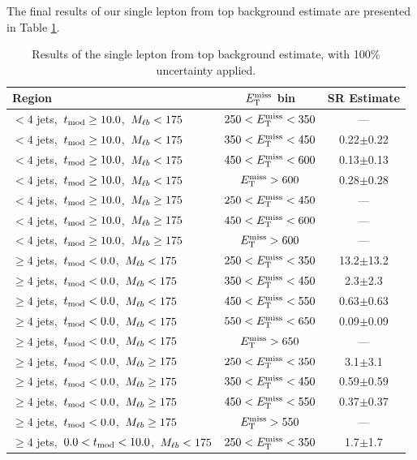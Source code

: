 The final results of our single lepton from top background estimate
are presented in Table \ref{tab:stop:1ltop:results}.

\begin{table}[htbp]
\centering
\caption{Results of the single lepton from top background estimate,
  with 100\% uncertainty applied.}
\label{tab:stop:1ltop:results}
\begin{tabular}{|l|c|c|}
\hline
Region & $E_\text{T}^\text{miss}$ bin & SR Estimate\\
\hline
$<4$ jets,~$t_\text{mod} \ge10.0$,~$M_{\ell b} <175$ & $250<E_\text{T}^\text{miss}<350$ &  ---  \\
$<4$ jets,~$t_\text{mod} \ge10.0$,~$M_{\ell b} <175$ & $350<E_\text{T}^\text{miss}<450$ &  0.22$\pm$0.22 \\
$<4$ jets,~$t_\text{mod} \ge10.0$,~$M_{\ell b} <175$ & $450<E_\text{T}^\text{miss}<600$ &  0.13$\pm$0.13  \\
$<4$ jets,~$t_\text{mod} \ge10.0$,~$M_{\ell b} <175$ & $E_\text{T}^\text{miss}>600$     &  0.28$\pm$0.28 \\
\hline
$<4$ jets,~$t_\text{mod} \ge10.0$,~$M_{\ell b} \ge175$ & $250<E_\text{T}^\text{miss}<450$ &  --- \\
$<4$ jets,~$t_\text{mod} \ge10.0$,~$M_{\ell b} \ge175$ & $450<E_\text{T}^\text{miss}<600$ &  ---  \\
$<4$ jets,~$t_\text{mod} \ge10.0$,~$M_{\ell b} \ge175$ & $E_\text{T}^\text{miss}>600$     &  ---  \\
\hline
$\ge4$ jets,~$t_\text{mod} <0.0$,~$M_{\ell b} <175$ & $250<E_\text{T}^\text{miss}<350$ &  13.2$\pm$13.2  \\
$\ge4$ jets,~$t_\text{mod} <0.0$,~$M_{\ell b} <175$ & $350<E_\text{T}^\text{miss}<450$ &  2.3$\pm$2.3  \\
$\ge4$ jets,~$t_\text{mod} <0.0$,~$M_{\ell b} <175$ & $450<E_\text{T}^\text{miss}<550$ &  0.63$\pm$0.63  \\
$\ge4$ jets,~$t_\text{mod} <0.0$,~$M_{\ell b} <175$ & $550<E_\text{T}^\text{miss}<650$ &  0.09$\pm$0.09 \\
$\ge4$ jets,~$t_\text{mod} <0.0$,~$M_{\ell b} <175$ & $E_\text{T}^\text{miss}>650$     &  --- \\
\hline
$\ge4$ jets,~$t_\text{mod} <0.0$,~$M_{\ell b} \ge175$ & $250<E_\text{T}^\text{miss}<350$ &  3.1$\pm$3.1  \\
$\ge4$ jets,~$t_\text{mod} <0.0$,~$M_{\ell b} \ge175$ & $350<E_\text{T}^\text{miss}<450$ &  0.59$\pm$0.59  \\
$\ge4$ jets,~$t_\text{mod} <0.0$,~$M_{\ell b} \ge175$ & $450<E_\text{T}^\text{miss}<550$ &  0.37$\pm$0.37  \\
$\ge4$ jets,~$t_\text{mod} <0.0$,~$M_{\ell b} \ge175$ & $E_\text{T}^\text{miss}>550$     &  ---  \\
\hline
$\ge4$ jets,~$0.0< t_\text{mod} <10.0$,~$M_{\ell b} <175$ & $250<E_\text{T}^\text{miss}<350$ &  1.7$\pm$1.7  \\

\end{tabular}
\end{table}
